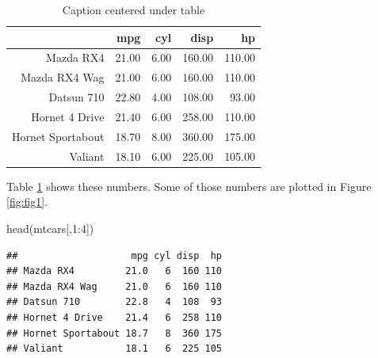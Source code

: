 \documentclass[useAMS,usenatbib,referee]{biom}
\newenvironment{Shaded}{\begin{snugshade}}{\end{snugshade}}
\newcommand{\DecValTok}[1]{\textcolor[rgb]{0.00,0.00,0.81}{#1}}
\newcommand{\FunctionTok}[1]{\textcolor[rgb]{0.00,0.00,0.00}{#1}}
\newcommand{\NormalTok}[1]{#1}
\newcommand{\SpecialCharTok}[1]{\textcolor[rgb]{0.00,0.00,0.00}{#1}}
\begin{document}
\begin{table}[ht]
\centering
\caption{Caption centered under table} 
\label{tab1}
\begin{tabular}{rrrrr}
  \hline
 & mpg & cyl & disp & hp \\ 
  \hline
Mazda RX4 & 21.00 & 6.00 & 160.00 & 110.00 \\ 
  Mazda RX4 Wag & 21.00 & 6.00 & 160.00 & 110.00 \\ 
  Datsun 710 & 22.80 & 4.00 & 108.00 & 93.00 \\ 
  Hornet 4 Drive & 21.40 & 6.00 & 258.00 & 110.00 \\ 
  Hornet Sportabout & 18.70 & 8.00 & 360.00 & 175.00 \\ 
  Valiant & 18.10 & 6.00 & 225.00 & 105.00 \\ 
   \hline
\end{tabular}
\end{table}

Table \ref{tab1} shows these numbers. Some of those numbers are plotted
in Figure \ref{fig:fig1}.

\begin{Shaded}
\begin{Highlighting}[]
\FunctionTok{head}\NormalTok{(mtcars[,}\DecValTok{1}\SpecialCharTok{:}\DecValTok{4}\NormalTok{])}
\end{Highlighting}
\end{Shaded}

\begin{verbatim}
##                    mpg cyl disp  hp
## Mazda RX4         21.0   6  160 110
## Mazda RX4 Wag     21.0   6  160 110
## Datsun 710        22.8   4  108  93
## Hornet 4 Drive    21.4   6  258 110
## Hornet Sportabout 18.7   8  360 175
## Valiant           18.1   6  225 105
\end{verbatim}






\label{lastpage}
\end{document}
